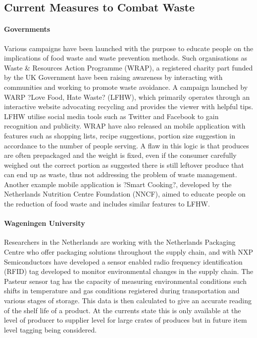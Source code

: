 \documentclass[a4paper, 11pt]{article}
\begin{document}
\vspace{\baselineskip}
\vspace{\baselineskip}
\vspace{\baselineskip}

\subsection{Current Measures to Combat Waste}

\paragraph{Governments} Various campaigns have been launched with the purpose to educate people on the implications of food waste and waste prevention methods. Such organisations as Waste \& Resources Action Programme (WRAP), a registered charity part funded by the UK Government have been raising awareness by interacting with communities and working to promote waste avoidance. A campaign launched by WARP ?Love Food, Hate Waste? (LFHW), which primarily operates through an interactive website advocating recycling and provides the viewer with helpful tips. LFHW utilise social media tools such as Twitter and Facebook to gain recognition and publicity. WRAP have also released an mobile application with features such as shopping lists, recipe suggestions, portion size suggestion in accordance to the number of people serving. A flaw in this logic is that produces are often prepackaged and the weight is fixed, even if the consumer carefully weighed out the correct portion as suggested there is still leftover produce that can end up as waste, thus not addressing the problem of waste management. Another example mobile application is ?Smart Cooking?, developed by the Netherlands Nutrition Centre Foundation (NNCF), aimed to educate people on the reduction of food waste and includes similar features to LFHW.

\paragraph{Wageningen University}Researchers in the Netherlands are working with the Netherlands Packaging Centre who offer packaging solutions throughout the supply chain, and with NXP Semiconductors have developed a sensor enabled radio frequency identification (RFID) tag developed to monitor environmental changes in the supply chain. The Pasteur sensor tag has the capacity of measuring environmental conditions such shifts in temperature and gas conditions registered during transportation and various stages of storage. This data is then calculated to give an accurate reading of the shelf life of a product. At the currents state this is only available at the level of producer to supplier level for large crates of produces but in future item level tagging being considered. 
\end{document}
